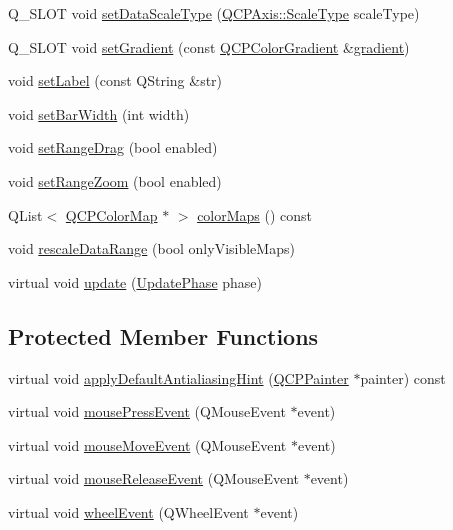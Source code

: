\begin{DoxyCompactItemize}
\item 
Q\+\_\+\+S\+L\+OT void \hyperlink{classQCPColorScale_aeb6107d67dd7325145b2498abae67fc3}{set\+Data\+Scale\+Type} (\hyperlink{classQCPAxis_a36d8e8658dbaa179bf2aeb973db2d6f0}{Q\+C\+P\+Axis\+::\+Scale\+Type} scale\+Type)
\item 
Q\+\_\+\+S\+L\+OT void \hyperlink{classQCPColorScale_a1f29583bb6f1e7f473b62fb712be3940}{set\+Gradient} (const \hyperlink{classQCPColorGradient}{Q\+C\+P\+Color\+Gradient} \&\hyperlink{classQCPColorScale_ac71a6cd853c97a2dbfd32f67afd399df}{gradient})
\item 
void \hyperlink{classQCPColorScale_aee124ae8396320cacf8276e9a0fbb8ce}{set\+Label} (const Q\+String \&str)
\item 
void \hyperlink{classQCPColorScale_ab9dcc0c1cd583477496209b1413bcb99}{set\+Bar\+Width} (int width)
\item 
void \hyperlink{classQCPColorScale_a21c51a55e4fd581b6feadca9ee5b38d5}{set\+Range\+Drag} (bool enabled)
\item 
void \hyperlink{classQCPColorScale_a96bd60fb6317ad6821841b539c93eeeb}{set\+Range\+Zoom} (bool enabled)
\item 
Q\+List$<$ \hyperlink{classQCPColorMap}{Q\+C\+P\+Color\+Map} $\ast$ $>$ \hyperlink{classQCPColorScale_a01bb96981614f2556ef7da04531a7a05}{color\+Maps} () const 
\item 
void \hyperlink{classQCPColorScale_a425983db4478543924ddbd04ea20a356}{rescale\+Data\+Range} (bool only\+Visible\+Maps)
\item 
virtual void \hyperlink{classQCPColorScale_ab8f6991ac88243fc582b44b183670334}{update} (\hyperlink{classQCPLayoutElement_a0d83360e05735735aaf6d7983c56374d}{Update\+Phase} phase)
\end{DoxyCompactItemize}
\subsection*{Protected Member Functions}
\begin{DoxyCompactItemize}
\item 
virtual void \hyperlink{classQCPColorScale_a23d530c340c15d2fce6583e7120ee8bd}{apply\+Default\+Antialiasing\+Hint} (\hyperlink{classQCPPainter}{Q\+C\+P\+Painter} $\ast$painter) const 
\item 
virtual void \hyperlink{classQCPColorScale_a5df6ad81b2ad045878d276c2d5be7120}{mouse\+Press\+Event} (Q\+Mouse\+Event $\ast$event)
\item 
virtual void \hyperlink{classQCPColorScale_a3aca469d531ce7b5882de73590aa0de6}{mouse\+Move\+Event} (Q\+Mouse\+Event $\ast$event)
\item 
virtual void \hyperlink{classQCPColorScale_a0916613d20901950fc6d00c6f99fe0a1}{mouse\+Release\+Event} (Q\+Mouse\+Event $\ast$event)
\item 
virtual void \hyperlink{classQCPColorScale_ab398e14c01240f3dc855884fe9e1ee8c}{wheel\+Event} (Q\+Wheel\+Event $\ast$event)
\end{DoxyCompactItemize}
